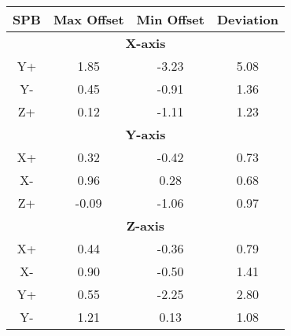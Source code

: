 
\begin{tabular}{|c|c|c|c|}
	\hline
	\acs{SPB}&Max Offset&Min Offset&Deviation\\
	\hline
	\multicolumn{4}{|c|}{\bfseries X-axis}\\
	\hline
	Y+&1.85&-3.23&5.08\\
	\hline
	Y-&0.45&-0.91&1.36\\
	\hline
	Z+&0.12&-1.11&1.23\\
	\hline
	\multicolumn{4}{|c|}{\bfseries Y-axis}\\
	\hline
	X+&0.32&-0.42&0.73\\
	\hline
	X-&0.96&0.28&0.68\\
	\hline
	Z+&-0.09&-1.06&0.97\\
	\hline
	\multicolumn{4}{|c|}{\bfseries Z-axis}\\
	\hline
	X+&0.44&-0.36&0.79\\
	\hline
	X-&0.90&-0.50&1.41\\
	\hline
	Y+&0.55&-2.25&2.80\\
	\hline
	Y-&1.21&0.13&1.08\\
	\hline
\end{tabular}

